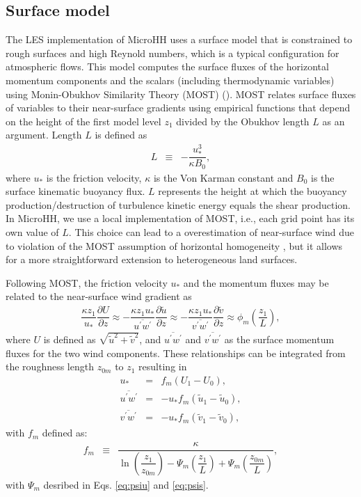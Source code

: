 \documentclass[gmd,manuscript]{copernicus}
\newcommand{\uf}{\ensuremath{\widetilde{u}}}
\newcommand{\vf}{\ensuremath{\widetilde{v}}}
\begin{document}
\subsection{Surface model}\label{sec:surface_model}
The LES implementation of MicroHH uses a surface model that is constrained to rough surfaces and high Reynold numbers, which is a typical configuration for atmospheric flows. This model computes the surface fluxes of the horizontal momentum components and the scalars (including thermodynamic variables) using Monin-Obukhov Similarity Theory (MOST) (\citet[][his Sect. 10.2]{Wyngaard2010}). MOST relates surface fluxes of variables to their near-surface gradients using empirical functions that depend on the height of the first model level $z_1$ divided by the Obukhov length $L$ as an argument. Length $L$ is defined as
\begin{eqnarray}
L   & \equiv & - \dfrac{u_*^3}{\kappa B_0},
\end{eqnarray}
where $u_*$ is the friction velocity, $\kappa$ is the Von Karman constant and $B_0$ is the surface kinematic buoyancy flux. $L$ represents the height at which the buoyancy production/destruction of turbulence kinetic energy equals the shear production. In MicroHH, we use a local implementation of MOST, i.e., each grid point has its own value of $L$. This choice can lead to a overestimation of near-surface wind due to violation of the MOST assumption of horizontal homogeneity \citep[][their Fig. 18]{Bouzeid2005}, but it allows for a more straightforward extension to heterogeneous land surfaces.

Following MOST, the friction velocity $u_*$ and the momentum fluxes may be related to the near-surface wind gradient as
\begin{eqnarray}
\dfrac{\kappa z_1}{u_*} \dfrac{\partial U}{\partial z}  \approx 
- \dfrac{\kappa z_1 u_*}{\overline{u^\prime w^\prime}} \dfrac{\partial \uf}{\partial z} \approx
- \dfrac{\kappa z_1 u_*}{\overline{v^\prime w^\prime}} \dfrac{\partial \vf}{\partial z} \approx
\phi_m \left( \dfrac{z_1}{L} \right),\label{eq:surf_grad}
\end{eqnarray}
where $U$ is defined as $\sqrt{\uf^2 + \vf^2}$, and $\overline{u^\prime w^\prime}$ and $\overline{v^\prime w^\prime}$ as the surface momentum fluxes for the two wind components. These relationships can be integrated from the roughness length $z_{0m}$ to $z_1$ resulting in 
\begin{eqnarray}
u_* & =  & f_m \left( U_1 - U_0 \right),\\
\overline{u^\prime w^\prime} & = & - u_* f_m \left( \uf_1 - \uf_0 \right),\\
\overline{v^\prime w^\prime} & = & - u_* f_m \left( \vf_1 - \vf_0 \right),
\end{eqnarray}
with $f_m$ defined as:
\begin{eqnarray}
f_m & \equiv & \dfrac{\kappa}
{ \ln{\left( \dfrac{z_1}{z_{0m}} \right)}
	- \varPsi_m \left( \dfrac{z_1}{L} \right)
	+ \varPsi_m \left( \dfrac{z_{0m}}{L} \right) }, \label{eq:fm}
\end{eqnarray}
with $\varPsi_m$ desribed in Eqs. \ref{eq:psiu} and \ref{eq:psis}.
\end{document}
